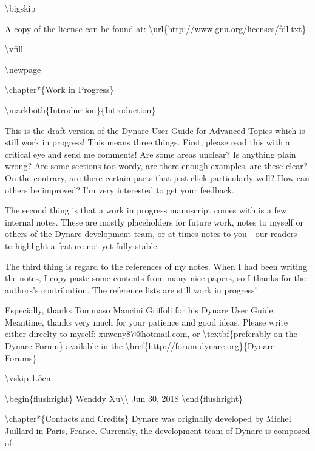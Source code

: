 \documentclass[10pt,math=newtx,citestyle=gb7714-2015,bibstyle=gb7714-2015]{elegantbook}
\begin{document}
	\textbackslash{}bigskip
	
	A copy of the license can be found at: \textbackslash{}url\{http://www.gnu.org/licenses/fdl.txt\}
	
	\textbackslash{}vfill
	
	\textbackslash{}newpage
	
	\textbackslash{}chapter*\{Work in Progress\}
	
	\textbackslash{}markboth\{Introduction\}\{Introduction\}
	
	
	This is the draft version of the Dynare User Guide for Advanced Topics which is still work in progress! This means three things. First, please read this with a critical eye and send me comments! Are some areas unclear? Is anything plain wrong? Are some sections too wordy, are there enough examples, are these clear? On the contrary, are there certain parts that just click particularly well? How can others be improved? I'm very interested to get your feedback. 
	
	The second thing is that a work in progress manuscript comes with is a few internal notes. These are mostly placeholders for future work, notes to myself or others of the Dynare development team, or at times notes to you - our readers - to highlight a feature not yet fully stable. 
	
	The third thing is regard to the references of my notes. When I had been writing the notes, I copy-paste some contents from many nice papers, so I thanks for the authors's contribution. The reference lists are still work in progress!
	
	Especially, thanks Tommaso Mancini Griffoli for his Dynare User Guide. Meantime, thanks very much for your patience and good ideas. Please write either direclty to myself: xuweny87@hotmail.com, or \textbackslash{}textbf\{preferably on the Dynare Forum\} available in the \textbackslash{}href\{http://forum.dynare.org\}\{Dynare Forums\}.
	
	
	
	\textbackslash{}vskip 1.5cm
	
	\textbackslash{}begin\{flushright\}
	Wenddy Xu\textbackslash{}\textbackslash{}
	Jun 30, 2018
	\textbackslash{}end\{flushright\}
	
	\textbackslash{}chapter*\{Contacts and Credits\} 
	Dynare was originally developed by Michel Juillard in Paris, France. Currently, the development team of Dynare is composed of
	
\end{document}
